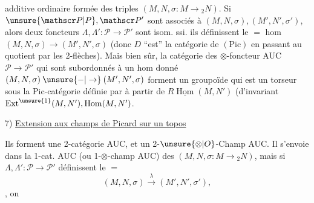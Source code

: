  additive ordinaire formée des triples $(M,N,\sigma\colon M\longrightarrow{}_2N)$. Si $\unsure{\mathscr P|P},\mathscr P'$ sont associés à $(M,N,\sigma),(M',N',\sigma')$, alors deux foncteurs $\Lambda,\Lambda'\colon\mathscr P\longrightarrow\mathscr P'$ sont isom. ssi. ils définissent le $=$ hom $(M,N,\sigma)\longrightarrow(M',N',\sigma)$ (donc $D$ ``est'' la catégorie  de $(\mathrm{Pic})$ en passant au quotient par les 2-flèches).
Mais bien sûr, la catégorie des $\otimes$-foncteur AUC $\mathscr P\longrightarrow\mathscr P'$ qui sont subordonnés à un hom donné $(M,N,\sigma)\mathbin{\unsure{-|\to}}(M',N',\sigma)$ forment un groupoïde qui est un torseur sous la Pic-catégorie définie par  à partir de $R\underline{\operatorname{Hom}}(M,N')$ (d'invariant $\operatorname{Ext}^{\unsure{1}}(M,N'),\operatorname{Hom}(M,N')$.

7)  \uline{Extension aux champs de Picard sur un topos}

Ils forment une 2-\inserted{$\otimes$-}catégorie AUC, et  un 2-$\unsure{\otimes|O}$-Champ AUC. Il s'envoie dans la 1-\inserted{$\otimes$-}cat. AUC (ou 1-$\otimes$-champ AUC) des $(M,N,\sigma\colon M\longrightarrow{}_2N)$, mais si $\Lambda,\Lambda'\colon\mathscr P\longrightarrow\mathscr P'$ définissent le $=$
\[
(M,N,\sigma)\xrightarrow{\lambda}(M',N',\sigma'),
\]
, on
